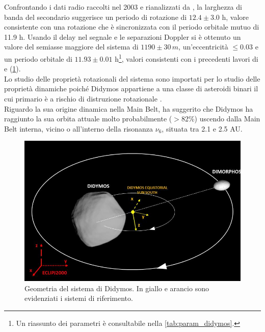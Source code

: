 \documentclass[a4paper,11pt,openright]{book}
\begin{document}
Confrontando i dati radio raccolti nel 2003 e rianalizzati da \citet{naidu_radar_2020}, la larghezza di banda del secondario suggerisce un periodo di rotazione di $12.4\pm 3.0$ h, valore consistente con una rotazione che è sincronizzata con il periodo orbitale mutuo di 11.9 h. Usando il delay nel segnale e le separazioni Doppler si è ottenuto un valore del semiasse maggiore del sistema di $1190\pm 30\, m$, un'eccentricità $\leq 0.03$ e un periodo orbitale di $11.93\pm 0.01$ h\footnote{Un riassunto dei parametri è consultabile nella \cref{tab:param_didymos}.}, valori consistenti con i precedenti lavori di \citet{scheirich_modeling_2009} e \citet{fang_near-earth_2012} (\cref{fig:system_orbit}).\\
Lo studio delle proprietà rotazionali del sistema sono importati per lo studio delle proprietà dinamiche poiché Didymos appartiene a una classe di asteroidi binari il cui primario è a rischio di distruzione rotazionale \citep{walsh_rotational_2008}.\\
Riguardo la sua origine dinamica nella Main Belt, \citet{richardson_dynamical_2016} ha suggerito che Didymos ha raggiunto la sua orbita attuale molto probabilmente ($>$82\%) uscendo dalla Main Belt interna, vicino o all'interno della risonanza $\nu_6$, situata tra 2.1 e 2.5 AU.


\begin{figure}[!h]
    \centering
    \includegraphics[scale=0.78]{figure/system_orbit.jpg}
    \caption[Geometria del sistema di Didymos. In giallo e arancio sono evidenziati i sistemi di riferimento.]{Geometria del sistema di Didymos. In giallo e arancio sono evidenziati i sistemi di riferimento. \citep{bottiglieri_applied_2022}}
    \label{fig:system_orbit}
\end{figure}
\end{document}
